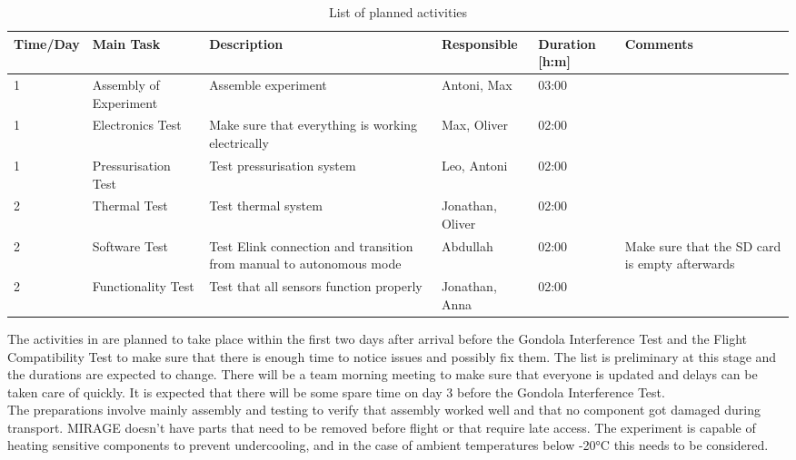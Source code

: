 \begin{table}[htbp]
\centering
\caption{List of planned activities}
\label{tab:preparation}
\begin{tabular}{p{1.5cm} p{2.5cm} p{4cm} p{2cm} p{1.5cm} p{2cm}}
\toprule
Time/Day & Main Task & Description & Responsible & Duration [h:m] & Comments\\
\midrule
1 & Assembly of Experiment & Assemble experiment & Antoni, Max & 03:00&\\
1 & Electronics Test & Make sure that everything is working electrically & Max, Oliver & 02:00&\\
1 & Pressurisation Test & Test pressurisation system & Leo, Antoni & 02:00 &\\
2 & Thermal Test & Test thermal system & Jonathan, Oliver & 02:00 &\\
2 & Software Test & Test Elink connection and transition from manual to autonomous mode & Abdullah & 02:00 & Make sure that the SD card is empty afterwards\\
2 & Functionality Test & Test that all sensors function properly & Jonathan, Anna & 02:00 & \\ 
\bottomrule
\end{tabular}
\end{table}

The activities in  are planned to take place within the first two days after arrival before the Gondola Interference Test and the Flight Compatibility Test to make sure that there is enough time to notice issues and possibly fix them. The list is preliminary at this stage and the durations are expected to change. There will be a team morning meeting to make sure that everyone is updated and delays can be taken care of quickly. It is expected that there will be some spare time on day 3 before the Gondola Interference Test.\\
The preparations involve mainly assembly and testing to verify that assembly worked well and that no component got damaged during transport. MIRAGE doesn't have parts that need to be removed before flight or that require late access. The experiment is capable of heating sensitive components to prevent undercooling, and in the case of ambient temperatures below -20°C this needs to be considered.
\clearpage


